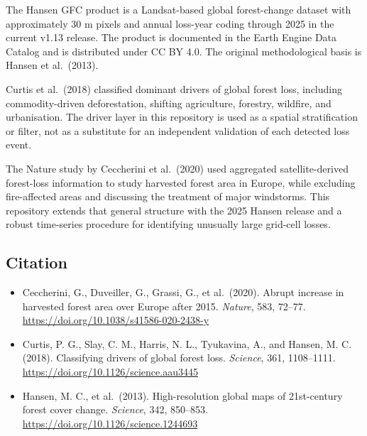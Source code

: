 \documentclass[
]{article}
\providecommand{\tightlist}{%
  \setlength{\itemsep}{0pt}\setlength{\parskip}{0pt}}
\begin{document}
The Hansen GFC product is a Landsat-based global forest-change dataset
with approximately 30 m pixels and annual loss-year coding through 2025
in the current v1.13 release. The product is documented in the Earth
Engine Data Catalog and is distributed under CC BY 4.0. The original
methodological basis is Hansen et al.~(2013).

Curtis et al.~(2018) classified dominant drivers of global forest loss,
including commodity-driven deforestation, shifting agriculture,
forestry, wildfire, and urbanisation. The driver layer in this
repository is used as a spatial stratification or filter, not as a
substitute for an independent validation of each detected loss event.

The Nature study by Ceccherini et al.~(2020) used aggregated
satellite-derived forest-loss information to study harvested forest area
in Europe, while excluding fire-affected areas and discussing the
treatment of major windstorms. This repository extends that general
structure with the 2025 Hansen release and a robust time-series
procedure for identifying unusually large grid-cell losses.

\subsection{Citation}\label{citation}

\begin{itemize}
\tightlist
\item
  Ceccherini, G., Duveiller, G., Grassi, G., et al.~(2020). Abrupt
  increase in harvested forest area over Europe after 2015.
  \emph{Nature}, 583, 72--77.
  \url{https://doi.org/10.1038/s41586-020-2438-y}
\item
  Curtis, P. G., Slay, C. M., Harris, N. L., Tyukavina, A., and Hansen,
  M. C. (2018). Classifying drivers of global forest loss.
  \emph{Science}, 361, 1108--1111.
  \url{https://doi.org/10.1126/science.aau3445}
\item
  Hansen, M. C., et al.~(2013). High-resolution global maps of
  21st-century forest cover change. \emph{Science}, 342, 850--853.
  \url{https://doi.org/10.1126/science.1244693}
\end{itemize}
\end{document}
